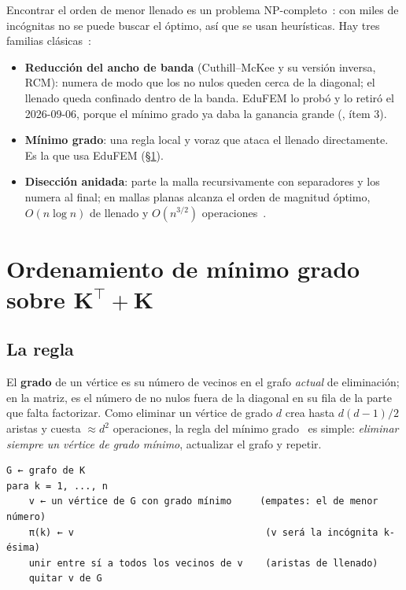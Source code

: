 \documentclass[11pt,a4paper]{article}
\newcommand{\cod}[1]{\texttt{\detokenize{#1}}}
\begin{document}
Encontrar el orden de menor llenado es un problema NP-completo~\cite{yannakakis1981}: con miles de incógnitas no se puede buscar el óptimo, así que se usan heurísticas. Hay tres familias clásicas~\cite{davis2016}:
\begin{itemize}
  \item \textbf{Reducción del ancho de banda} (Cuthill--McKee y su versión inversa, RCM): numera de modo que los no nulos queden cerca de la diagonal; el llenado queda confinado dentro de la banda. EduFEM lo probó y lo retiró el 2026-09-06, porque el mínimo grado ya daba la ganancia grande (\cod{docs/convenciones/roadmap-fem.md}, ítem 3).
  \item \textbf{Mínimo grado}: una regla local y voraz que ataca el llenado directamente. Es la que usa EduFEM (§\ref{sec:md}).
  \item \textbf{Disección anidada}: parte la malla recursivamente con separadores y los numera al final; en mallas planas alcanza el orden de magnitud óptimo, $O(n\log n)$ de llenado y $O(n^{3/2})$ operaciones~\cite{george1973}.
\end{itemize}

\section{Ordenamiento de mínimo grado sobre \texorpdfstring{$\bm{K}^{\top}+\bm{K}$}{KT+K}}\label{sec:md}

\subsection{La regla}

El \textbf{grado} de un vértice es su número de vecinos en el grafo \emph{actual} de eliminación; en la matriz, es el número de no nulos fuera de la diagonal en su fila de la parte que falta factorizar. Como eliminar un vértice de grado $d$ crea hasta $d(d-1)/2$ aristas y cuesta $\approx d^2$ operaciones, la regla del mínimo grado~\cite{markowitz1957,tinney1967} es simple: \emph{eliminar siempre un vértice de grado mínimo}, actualizar el grafo y repetir.

\begin{lstlisting}[style=algo,title={\textbf{Algoritmo 2.} Mínimo grado.}]
G ← grafo de K
para k = 1, ..., n
    v ← un vértice de G con grado mínimo     (empates: el de menor número)
    π(k) ← v                                  (v será la incógnita k-ésima)
    unir entre sí a todos los vecinos de v    (aristas de llenado)
    quitar v de G
\end{lstlisting}
\end{document}
